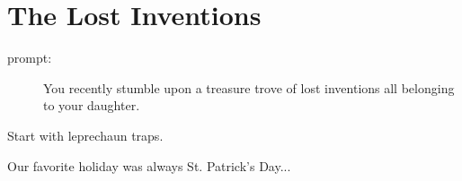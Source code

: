 \section*{The Lost Inventions}

\begin{description}
\item[prompt:] You recently stumble upon a treasure trove of lost inventions all belonging to your daughter.
\end{description}


Start with leprechaun traps.

Our favorite holiday was always St. Patrick's Day...
